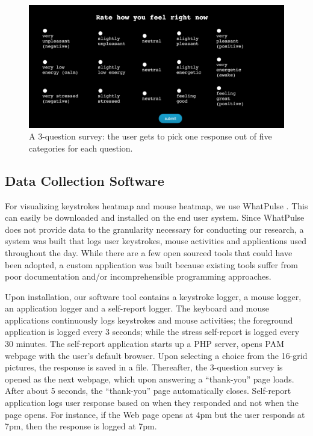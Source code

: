 \documentclass{article}
\begin{document}
\begin{figure}[ht]
	\begin{center}
		\centerline{\includegraphics[width=\columnwidth]{ema}}
		\caption{A 3-question survey: the user gets to pick one response out of five categories for each question. 
		}
		\label{ema}
	\end{center}
	\vskip -0.2in
\end{figure} 


\subsection{Data Collection Software}
For visualizing keystrokes heatmap and mouse heatmap, we use WhatPulse \cite{whatpulse}. This can easily be downloaded and installed on the end user system. Since WhatPulse does not provide data to the granularity necessary for conducting our research, a system was built that logs user keystrokes, mouse activities and applications used throughout the day. While there are a few open sourced tools that could have been adopted, a custom application was built because existing tools suffer from poor documentation and/or incomprehensible programming approaches. 

Upon installation, our software tool contains a keystroke logger, a mouse logger, an application logger and a self-report logger. The keyboard and mouse applications continuously logs keystrokes and mouse activities; the foreground application is logged every 3 seconds; while the stress self-report is logged every 30 minutes. The self-report application starts up a PHP server, opens PAM webpage with the user's default browser. Upon selecting a choice from the 16-grid pictures, the response is saved in a file. Thereafter, the 3-question survey is opened as the next webpage, which upon answering a ``thank-you'' page loads. After about 5 seconds, the ``thank-you'' page automatically closes. Self-report application logs user response based on when they responded and not when the page opens. For instance, if the Web page opens at 4pm but the user responds at 7pm, then the response is logged at 7pm. 
\end{document}
